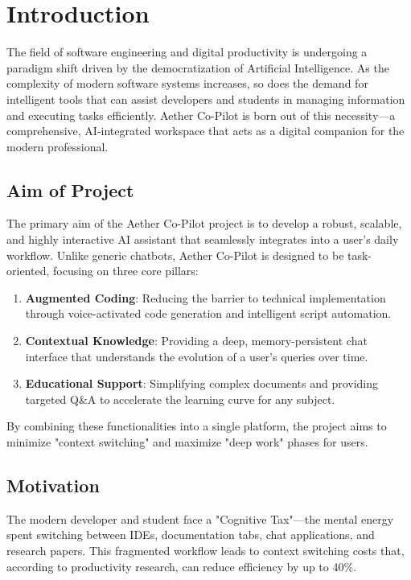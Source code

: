 \chapter{Introduction}

The field of software engineering and digital productivity is undergoing a paradigm shift driven by the democratization of Artificial Intelligence. As the complexity of modern software systems increases, so does the demand for intelligent tools that can assist developers and students in managing information and executing tasks efficiently. Aether Co-Pilot is born out of this necessity—a comprehensive, AI-integrated workspace that acts as a digital companion for the modern professional.

\section{Aim of Project}

The primary aim of the Aether Co-Pilot project is to develop a robust, scalable, and highly interactive AI assistant that seamlessly integrates into a user's daily workflow. Unlike generic chatbots, Aether Co-Pilot is designed to be task-oriented, focusing on three core pillars:
\begin{enumerate}
    \item \textbf{Augmented Coding}: Reducing the barrier to technical implementation through voice-activated code generation and intelligent script automation.
    \item \textbf{Contextual Knowledge}: Providing a deep, memory-persistent chat interface that understands the evolution of a user's queries over time.
    \item \textbf{Educational Support}: Simplifying complex documents and providing targeted Q\&A to accelerate the learning curve for any subject.
\end{enumerate}

By combining these functionalities into a single platform, the project aims to minimize "context switching" and maximize "deep work" phases for users.

\section{Motivation}

The modern developer and student face a "Cognitive Tax"—the mental energy spent switching between IDEs, documentation tabs, chat applications, and research papers. This fragmented workflow leads to context switching costs that, according to productivity research, can reduce efficiency by up to 40\%. 

